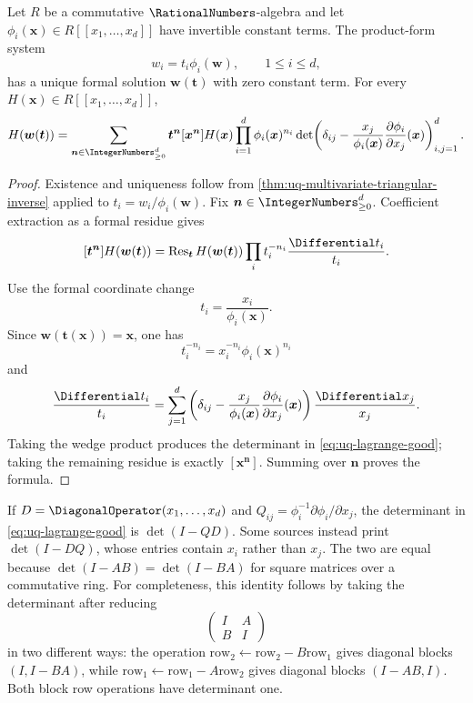 \begin{theorem}
\label{thm:uq-lagrange-good}
Let \(R\) be a commutative \(\RationalNumbers\)-algebra and let
\(\phi_i(\bm x)\in R[[x_1,\ldots,x_d]]\) have invertible constant terms.
The product-form system
\[
 w_i=t_i\phi_i(\bm w),\qquad 1\le i\le d,
\]
has a unique formal solution \(\bm w(\bm t)\) with zero constant term.  For
every \(H(\bm x)\in R[[x_1,\ldots,x_d]]\),
\begin{equation}
\label{eq:uq-lagrange-good}
 H(\bm w(\bm t))
 =
 \sum_{\bm n\in\IntegerNumbers_{\ge0}^d}\bm t^{\bm n}
 [\bm x^{\bm n}]
 H(\bm x)\prod_{i=1}^{d}\phi_i(\bm x)^{n_i}
 \det\!\left(
 \delta_{ij}
 -\frac{x_j}{\phi_i(\bm x)}
 \frac{\partial\phi_i}{\partial x_j}(\bm x)
 \right)_{i,j=1}^{d}.
\end{equation}
\end{theorem}

\begin{proof}
Existence and uniqueness follow from
\cref{thm:uq-multivariate-triangular-inverse} applied to
\(t_i=w_i/\phi_i(\bm w)\).  Fix \(\bm n\in\IntegerNumbers_{\ge0}^d\).  Coefficient extraction
as a formal residue gives
\[
 [\bm t^{\bm n}]H(\bm w(\bm t))
 =
 \operatorname{Res}_{\bm t}
 H(\bm w(\bm t))
 \prod_i t_i^{-n_i}\frac{\Differential t_i}{t_i}.
\]
Use the formal coordinate change
\[
 t_i=\frac{x_i}{\phi_i(\bm x)}.
\]
Since \(\bm w(\bm t(\bm x))=\bm x\), one has
\[
 t_i^{-n_i}=x_i^{-n_i}\phi_i(\bm x)^{n_i}
\]
and
\[
 \frac{\Differential t_i}{t_i}
 =\sum_{j=1}^{d}\left(
 \delta_{ij}
 -\frac{x_j}{\phi_i(\bm x)}
 \frac{\partial\phi_i}{\partial x_j}(\bm x)
 \right)\frac{\Differential x_j}{x_j}.
\]
Taking the wedge product produces the determinant in
\eqref{eq:uq-lagrange-good}; taking the remaining residue is exactly
\([\bm x^{\bm n}]\).  Summing over \(\bm n\) proves the formula.
\end{proof}

\begin{remark}
\label{rem:uq-good-determinant}
If \(D=\DiagonalOperator(x_1,\ldots,x_d)\) and
\(Q_{ij}=\phi_i^{-1}\partial\phi_i/\partial x_j\), the determinant in
\eqref{eq:uq-lagrange-good} is \(\det(I-QD)\).  Some sources instead print
\(\det(I-DQ)\), whose entries contain \(x_i\) rather than \(x_j\).
The two are equal because \(\det(I-AB)=\det(I-BA)\) for square matrices over
a commutative ring.  For completeness, this identity follows by taking the
determinant after reducing
\[
 \begin{pmatrix}I&A\\ B&I\end{pmatrix}
\]
in two different ways: the operation
\(\text{row}_2\leftarrow\text{row}_2-B\text{row}_1\) gives diagonal blocks
\((I,I-BA)\), while
\(\text{row}_1\leftarrow\text{row}_1-A\text{row}_2\) gives diagonal blocks
\((I-AB,I)\).  Both block row operations have determinant one.
\end{remark}

